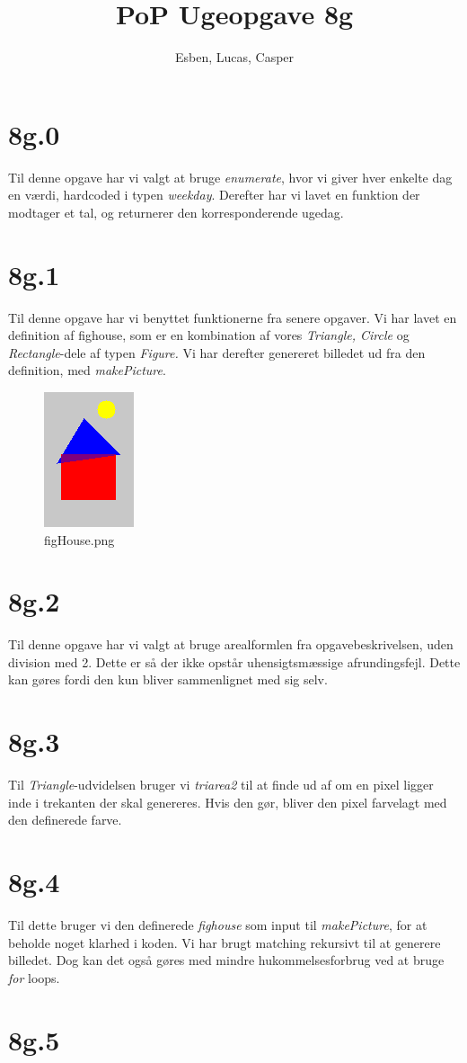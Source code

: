 \documentclass[12pt,a4paper]{article}
\title{PoP Ugeopgave 8g}
\author{Esben, Lucas, Casper}
\begin{document}
\maketitle

\section*{8g.0}
Til denne opgave har vi valgt at bruge \textit{enumerate}, hvor vi giver hver enkelte dag en værdi, hardcoded i typen \textit{weekday}. Derefter har vi lavet en funktion der modtager et tal, og returnerer den korresponderende ugedag.
\section*{8g.1}
Til denne opgave har vi benyttet funktionerne fra senere opgaver. Vi har lavet en definition af fighouse, som er en kombination af vores \textit{Triangle, Circle} og \textit{Rectangle}-dele af typen \textit{Figure.} Vi har derefter genereret billedet ud fra den definition, med \textit{makePicture}.
\begin{figure}[H]
\centering
\includegraphics{figHouse.png}
\caption{figHouse.png}
\end{figure}

\section*{8g.2}
Til denne opgave har vi valgt at bruge arealformlen fra opgavebeskrivelsen, uden division med 2. Dette er så der ikke opstår uhensigtsmæssige afrundingsfejl. Dette kan gøres fordi den kun bliver sammenlignet med sig selv.
\section*{8g.3}
Til \textit{Triangle}-udvidelsen bruger vi \textit{triarea2} til at finde ud af om en pixel ligger inde i trekanten der skal genereres. Hvis den gør, bliver den pixel farvelagt med den definerede farve.
\section*{8g.4}
Til dette bruger vi den definerede \textit{fighouse} som input til \textit{makePicture}, for at beholde noget klarhed i koden. Vi har brugt matching rekursivt til at generere billedet. Dog kan det også gøres med mindre hukommelsesforbrug ved at bruge \textit{for} loops.
\section{8g.5}
\end{document}
